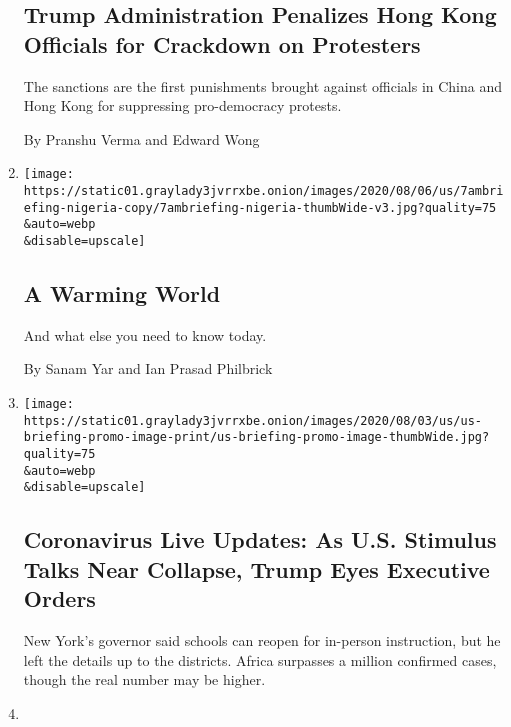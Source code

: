 \begin{enumerate}
  \hypertarget{trump-administration-penalizes-hong-kong-officials-for-crackdown-on-protesters}{%
  \subsection{Trump Administration Penalizes Hong Kong Officials for
  Crackdown on
  Protesters}\label{trump-administration-penalizes-hong-kong-officials-for-crackdown-on-protesters}}

  The sanctions are the first punishments brought against officials in
  China and Hong Kong for suppressing pro-democracy protests.

  By Pranshu Verma and Edward Wong
\item
  \href{/2020/08/07/briefing/coronavirus-suffrage-tiktok-your-friday-briefing.html}{}

  \texttt{[image: https://static01.graylady3jvrrxbe.onion/images/2020/08/06/us/7ambriefing-nigeria-copy/7ambriefing-nigeria-thumbWide-v3.jpg?quality=75\\\&auto=webp\\\&disable=upscale]}

  \hypertarget{a-warming-world}{%
  \subsection{A Warming World}\label{a-warming-world}}

  And what else you need to know today.

  By Sanam Yar and Ian Prasad Philbrick
\item
  \href{/2020/08/07/world/covid-19-news.html}{}

  \texttt{[image: https://static01.graylady3jvrrxbe.onion/images/2020/08/03/us/us-briefing-promo-image-print/us-briefing-promo-image-thumbWide.jpg?quality=75\\\&auto=webp\\\&disable=upscale]}

  \hypertarget{coronavirus-live-updates-as-us-stimulus-talks-near-collapse-trump-eyes-executive-orders}{%
  \subsection{Coronavirus Live Updates: As U.S. Stimulus Talks Near
  Collapse, Trump Eyes Executive
  Orders}\label{coronavirus-live-updates-as-us-stimulus-talks-near-collapse-trump-eyes-executive-orders}}

  New York's governor said schools can reopen for in-person instruction,
  but he left the details up to the districts. Africa surpasses a
  million confirmed cases, though the real number may be higher.
\item
  \href{/interactive/2020/08/07/briefing/beirut-tiktok-census-bureau-news-quiz.html}{}


\end{enumerate}
